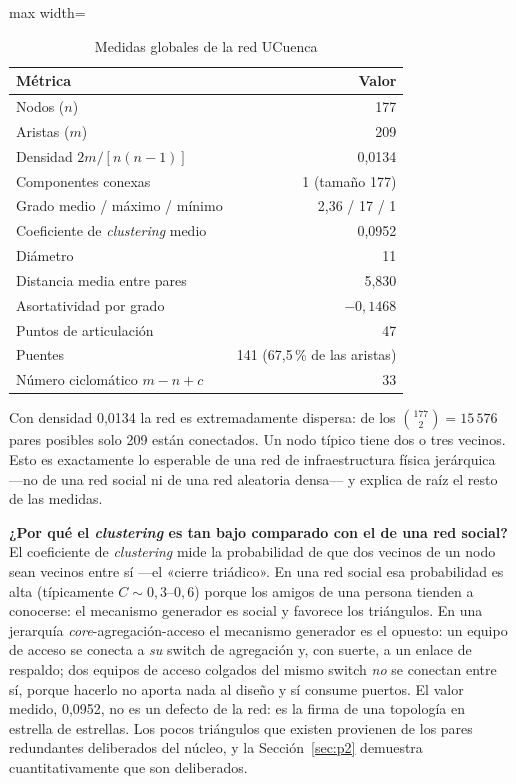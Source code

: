 \documentclass[10pt,a4paper]{extarticle}
\begin{document}
\begin{table}[H]
\centering
\caption{Medidas globales de la red UCuenca}
\label{tab:globales}
\small
\begin{adjustbox}{max width=\textwidth}
\begin{tabular}{lr}
\toprule
\textbf{Métrica} & \textbf{Valor} \\
\midrule
Nodos ($n$)                       & 177 \\
Aristas ($m$)                     & 209 \\
Densidad $2m/[n(n-1)]$            & 0,0134 \\
Componentes conexas               & 1 (tamaño 177) \\
Grado medio / máximo / mínimo     & 2,36 / 17 / 1 \\
Coeficiente de \textit{clustering} medio & 0,0952 \\
Diámetro                          & 11 \\
Distancia media entre pares       & 5,830 \\
Asortatividad por grado           & $-0{,}1468$ \\
Puntos de articulación            & 47 \\
Puentes                           & 141 (67,5\,\% de las aristas) \\
Número ciclomático $m-n+c$        & 33 \\
\bottomrule
\end{tabular}
\end{adjustbox}
\end{table}

Con densidad 0,0134 la red es extremadamente dispersa: de los $\binom{177}{2} = 15\,576$
pares posibles solo 209 están conectados. Un nodo típico tiene dos o tres vecinos. Esto es
exactamente lo esperable de una red de infraestructura física jerárquica ---no de una red
social ni de una red aleatoria densa--- y explica de raíz el resto de las medidas.

\textbf{¿Por qué el \textit{clustering} es tan bajo comparado con el de una red social?}
El coeficiente de \textit{clustering} mide la probabilidad de que dos vecinos de un nodo
sean vecinos entre sí ---el «cierre triádico». En una red social esa probabilidad es alta
(típicamente $C \sim 0{,}3$--$0{,}6$) porque los amigos de una persona tienden a conocerse:
el mecanismo generador es social y favorece los triángulos. En una jerarquía
\textit{core}-agregación-acceso el mecanismo generador es el opuesto: un equipo de acceso
se conecta a \textit{su} switch de agregación y, con suerte, a un enlace de respaldo; dos
equipos de acceso colgados del mismo switch \textit{no} se conectan entre sí, porque
hacerlo no aporta nada al diseño y sí consume puertos. El valor medido, 0,0952, no es un
defecto de la red: es la firma de una topología en estrella de estrellas. Los pocos
triángulos que existen provienen de los pares redundantes deliberados del núcleo, y la
Sección~\ref{sec:p2} demuestra cuantitativamente que son deliberados.
\end{document}
